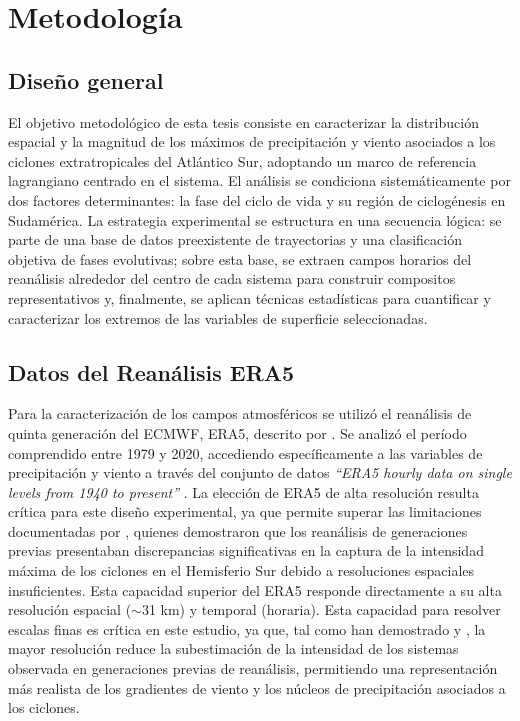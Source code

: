 \chapter{Metodología}\label{ch:metodologia}

\section{Diseño general}\label{sec:diseno_general}

El objetivo metodológico de esta tesis consiste en caracterizar la distribución espacial y la magnitud de los máximos de precipitación y viento asociados a los ciclones extratropicales del Atlántico Sur, adoptando un marco de referencia lagrangiano centrado en el sistema. 
El análisis se condiciona sistemáticamente por dos factores determinantes: la fase del ciclo de vida y su región de ciclogénesis en Sudamérica. 
La estrategia experimental se estructura en una secuencia lógica: se parte de una base de datos preexistente de trayectorias y una clasificación objetiva de fases evolutivas; sobre esta base, se extraen campos horarios del reanálisis alrededor del centro de cada sistema para construir compositos representativos y, finalmente, se aplican técnicas estadísticas para cuantificar y caracterizar los extremos de las variables de superficie seleccionadas.

\section{Datos del Reanálisis ERA5}\label{sec:datos_era5}

Para la caracterización de los campos atmosféricos se utilizó el reanálisis de quinta generación del ECMWF, ERA5, descrito por \citet{hersbach2020era5}. 
Se analizó el período comprendido entre 1979 y 2020, accediendo específicamente a las variables de precipitación y viento a través del conjunto de datos \textit{``ERA5 hourly data on single levels from 1940 to present''} \citep{hersbach_era5_2023b}. 
La elección de ERA5 de alta resolución resulta crítica para este diseño experimental, ya que permite superar las limitaciones documentadas por \citet{hodges2011comparison}, quienes demostraron que los reanálisis de generaciones previas presentaban discrepancias significativas en la captura de la intensidad máxima de los ciclones en el Hemisferio Sur debido a resoluciones espaciales insuficientes. 
Esta capacidad superior del ERA5 responde directamente a su alta resolución espacial ($\sim$31 km) y temporal (horaria). 
Esta capacidad para resolver escalas finas es crítica en este estudio, ya que, tal como han demostrado \citet{priestley2022improved} y \citet{dalanhese2023new}, la mayor resolución reduce la subestimación de la intensidad de los sistemas observada en generaciones previas de reanálisis, permitiendo una representación más realista de los gradientes de viento y los núcleos de precipitación asociados a los ciclones.

